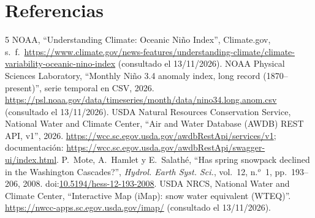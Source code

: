 \documentclass{article}
\renewcommand{\refname}{Referencias}
\begin{document}
\section{Referencias}
\renewcommand{\refname}{}
\begin{thebibliography}{5}
 NOAA, ``Understanding Climate: Oceanic Niño Index'', Climate.gov, s.~f.\ \url{https://www.climate.gov/news-features/understanding-climate/climate-variability-oceanic-nino-index} (consultado el 13/11/2026).
 NOAA Physical Sciences Laboratory, ``Monthly Niño 3.4 anomaly index, long record (1870--present)'', serie temporal en CSV, 2026. \url{https://psl.noaa.gov/data/timeseries/month/data/nino34.long.anom.csv} (consultado el 13/11/2026).
 USDA Natural Resources Conservation Service, National Water and Climate Center, ``Air and Water Database (AWDB) REST API, v1'', 2026. \url{https://wcc.sc.egov.usda.gov/awdbRestApi/services/v1}; documentación: \url{https://wcc.sc.egov.usda.gov/awdbRestApi/swagger-ui/index.html}.
 P.~Mote, A.~Hamlet y E.~Salathé, ``Has spring snowpack declined in the Washington Cascades?'', \emph{Hydrol. Earth Syst. Sci.}, vol.~12, n.\({}^{o}\)~1, pp.~193--206, 2008. doi:\href{https://doi.org/10.5194/hess-12-193-2008}{10.5194/hess-12-193-2008}.
 USDA NRCS, National Water and Climate Center, ``Interactive Map (iMap): snow water equivalent (WTEQ)''. \href{https://nwcc-apps.sc.egov.usda.gov/imap/}{https://nwcc-apps.sc.egov.usda.gov/imap/} (consultado el 13/11/2026).
\end{thebibliography}
\endgroup
\end{document}
